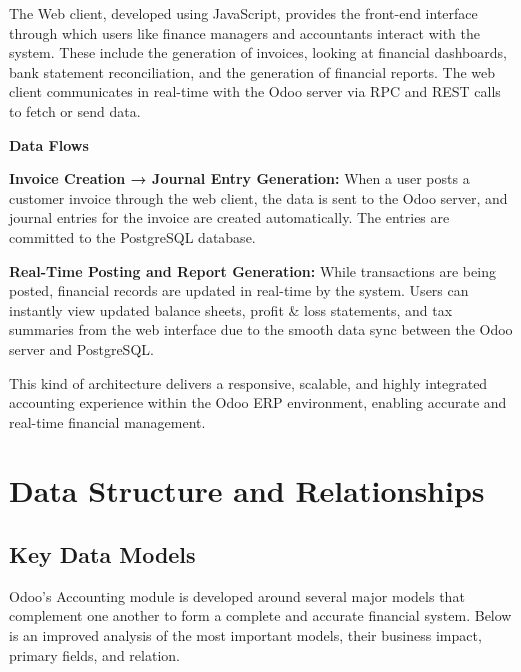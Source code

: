 \documentclass[11pt,a4paper]{article}
\begin{document}
\noindent The Web client, developed using JavaScript, provides the front-end interface through which users like finance managers and accountants interact with the system. These include the generation of invoices, looking at financial dashboards, bank statement reconciliation, and the generation of financial reports. The web client communicates in real-time with the Odoo server via RPC and REST calls to fetch or send data.
\bigskip

\noindent\textbf{Data Flows}

\noindent\textbf{Invoice Creation → Journal Entry Generation:}
When a user posts a customer invoice through the web client, the data is sent to the Odoo server, and journal entries for the invoice are created automatically. The entries are committed to the PostgreSQL database.

\noindent\textbf{Real-Time Posting and Report Generation:}
While transactions are being posted, financial records are updated in real-time by the system. Users can instantly view updated balance sheets, profit \& loss statements, and tax summaries from the web interface due to the smooth data sync between the Odoo server and PostgreSQL.
\medskip

\noindent This kind of architecture delivers a responsive, scalable, and highly integrated accounting experience within the Odoo ERP environment, enabling accurate and real-time financial management.

\newpage
\section{Data Structure and Relationships}
\subsection{Key Data Models}
Odoo's Accounting module is developed around several major models that complement one another to form a complete and accurate financial system. Below is an improved analysis of the most important models, their business impact, primary fields, and relation.
\end{document}
